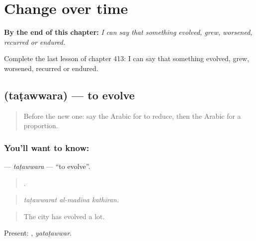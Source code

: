 
\chapter{Change over time}
\label{ch:ar-change-over-time}

\begin{chapteropening}
\textbf{By the end of this chapter:} \emph{I can say that something evolved, grew, worsened, recurred or endured.}

Complete the last lesson of chapter 413: I can say that something evolved, grew, worsened, recurred or endured.
\end{chapteropening}

\section[\texorpdfstring{\ar{تطور} (taṭawwara)}{تطور (taṭawwara)}]{ (taṭawwara) — to evolve}

\label{lesson:AR-C413-tatawwara}



\begin{quote}
Before the new one: say the Arabic for to reduce, then the Arabic for a proportion.
\end{quote}

\subsection*{You'll want to know: }
\textbf{} — \emph{taṭawwara} — \textquotedblleft{}to evolve\textquotedblright{}.

\begin{quote}
  .
\end{quote}

\begin{quote}
\emph{taṭawwarat al-madīna kathīran.}
\end{quote}

\begin{quote}
The city has evolved a lot.
\end{quote}

Present: , \emph{yataṭawwar}.

